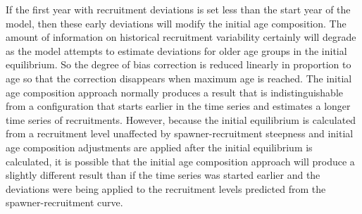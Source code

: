 If the first year with recruitment deviations is set less than the start year of the model, then these early deviations will modify the initial age composition.  The amount of information on historical recruitment variability certainly will degrade as the model attempts to estimate deviations for older age groups in the initial equilibrium.  So the degree of bias correction is reduced linearly in proportion to age so that the correction disappears when maximum age is reached.  The initial age composition approach normally produces a result that is indistinguishable from a configuration that starts earlier in the time series and estimates a longer time series of recruitments.  However, because the initial equilibrium is calculated from a recruitment level unaffected by spawner-recruitment steepness and initial age composition adjustments are applied after the initial equilibrium is calculated, it is possible that the initial age composition approach will produce a slightly different result than if the time series was started earlier and the deviations were being applied to the recruitment levels predicted from the spawner-recruitment curve. 

